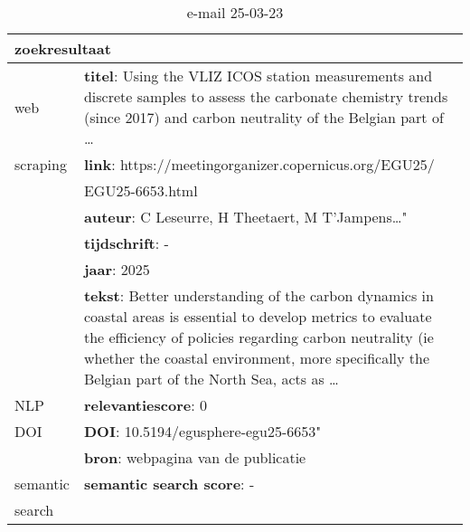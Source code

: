 \begin{table}[h!]
    \caption{e-mail 25-03-23}
    \centering
    \begin{tabularx}{\textwidth}{|p{4cm}|X|} 
        \hline
        \multicolumn{2}{|X|}{\textbf{zoekresultaat}} \\
        \hline
        web &\textbf{titel}: Using the VLIZ ICOS station measurements and discrete samples to assess the carbonate chemistry trends (since 2017) and carbon neutrality of the Belgian part of …\\
        scraping&\textbf{link}: https://meetingorganizer.copernicus.org/EGU25/\\&EGU25-6653.html\\
        &\textbf{auteur}: C Leseurre, H Theetaert, M T'Jampens…"\\
        &\textbf{tijdschrift}: -\\
        &\textbf{jaar}: 2025\\
        &\textbf{tekst}: Better understanding of the carbon dynamics in coastal areas is essential to develop metrics to evaluate the efficiency of policies regarding carbon neutrality (ie whether the coastal environment, more specifically the Belgian part of the North Sea, acts as …\\
        \hline
        NLP&\textbf{relevantiescore}: 0\\
        \hline
        DOI&\textbf{DOI}: 10.5194/egusphere-egu25-6653"\\
        &\textbf{bron}: webpagina van de publicatie\\
        \hline
        semantic&\textbf{semantic search score}: -\\
        search&\\
        \hline
    \end{tabularx}
    \label{table:email20250323}
\end{table}
